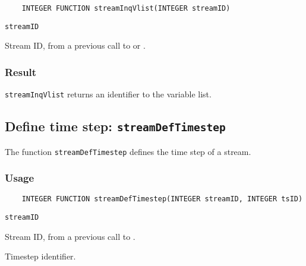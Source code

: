 \begin{verbatim}
    INTEGER FUNCTION streamInqVlist(INTEGER streamID)
\end{verbatim}

\hspace*{4mm}\begin{minipage}[]{15cm}
\begin{deflist}{\tt streamID\ }
\item[{\tt streamID}]
Stream ID, from a previous call to {} or {}.

\end{deflist}
\end{minipage}

\subsubsection*{Result}

{\tt streamInqVlist} returns an identifier to the variable list.



\subsection{Define time step: {\tt streamDefTimestep}}
\label{streamDefTimestep}

The function {\tt streamDefTimestep} defines the time step of a stream.

\subsubsection*{Usage}

\begin{verbatim}
    INTEGER FUNCTION streamDefTimestep(INTEGER streamID, INTEGER tsID)
\end{verbatim}

\hspace*{4mm}\begin{minipage}[]{15cm}
\begin{deflist}{\tt streamID\ }
\item[{\tt streamID}]
Stream ID, from a previous call to {}.
\item[{\tt tsID}]
Timestep identifier.

\end{deflist}
\end{minipage}

